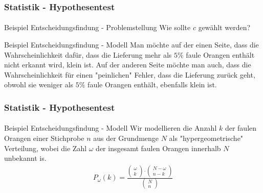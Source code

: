\documentclass{beamer}
\begin{document}
\begin{frame}
    \frametitle{Statistik - Hypothesentest}
\framesubtitle{}
\begin{block}{Beispiel Entscheidungsfindung - Problemstellung}
Wie sollte $c$ gewählt werden?
\end{block}


\begin{block}{Beispiel Entscheidungsfindung - Modell}
Man möchte auf der einen Seite, dass die Wahrscheinlichkeit dafür, dass die Lieferung mehr als $5 \%$ faule Orangen enthält nicht erkannt wird, klein ist.
Auf der anderen Seite möchte man auch, dass die Wahrscheinlichkeit für einen  "peinlichen" Fehler, dass die Lieferung zurück geht, obwohl sie weniger als  $5 \%$ faule Orangen enthält, ebenfalls klein ist. 
\end{block}


 \end{frame}


\begin{frame}
    \frametitle{Statistik - Hypothesentest}
\framesubtitle{}
\begin{block}{Beispiel Entscheidungsfindung - Modell}
Wir modellieren die Anzahl $k$ der faulen Orangen einer Stichprobe $n$ aus der Grundmenge $N$ als "hypergeometrische" Verteilung, wobei die Zahl  $\omega$ der insgesamt faulen  Orangen innerhalb $N$ unbekannt is.
\begin{align*}
P_\omega (k)= \frac{\begin{pmatrix} \omega \\ k \end{pmatrix} \cdot  \begin{pmatrix} N - \omega \\ n - k \end{pmatrix}}{\begin{pmatrix} N \\ n \end{pmatrix} }
\end{align*} 
\end{block}


 \end{frame}
\end{document}
